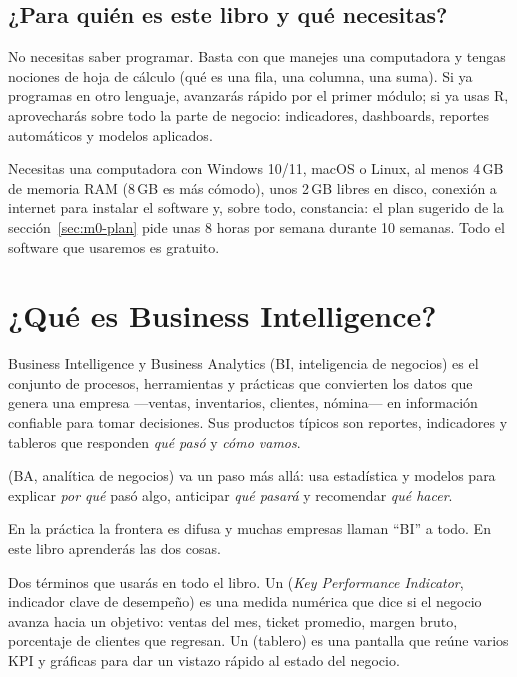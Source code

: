 \subsection{¿Para quién es este libro y qué necesitas?}

No necesitas saber programar. Basta con que manejes una computadora y tengas
nociones de hoja de cálculo (qué es una fila, una columna, una suma). Si ya
programas en otro lenguaje, avanzarás rápido por el primer módulo; si ya
usas R, aprovecharás sobre todo la parte de negocio: indicadores,
dashboards, reportes automáticos y modelos aplicados.

Necesitas una computadora con Windows 10/11, macOS o Linux, al menos 4\,GB
de memoria RAM (8\,GB es más cómodo), unos 2\,GB libres en disco, conexión a
internet para instalar el software y, sobre todo, constancia: el plan
sugerido de la sección~\ref{sec:m0-plan} pide unas 8 horas por semana
durante 10 semanas. Todo el software que usaremos es gratuito.

\section{¿Qué es Business Intelligence?}
\label{sec:m0-que-es-bi}

\begin{concepto}{Business Intelligence y Business Analytics}
 (BI, inteligencia de negocios) es el
conjunto de procesos, herramientas y prácticas que convierten los datos que
genera una empresa ---ventas, inventarios, clientes, nómina--- en
información confiable para tomar decisiones. Sus productos típicos son
reportes, indicadores y tableros que responden \emph{qué pasó} y \emph{cómo
vamos}.

 (BA, analítica de negocios) va un paso más
allá: usa estadística y modelos para explicar \emph{por qué} pasó algo,
anticipar \emph{qué pasará} y recomendar \emph{qué hacer}.

En la práctica la frontera es difusa y muchas empresas llaman ``BI'' a
todo. En este libro aprenderás las dos cosas.
\end{concepto}

Dos términos que usarás en todo el libro. Un  (\textit{Key
Performance Indicator}, indicador clave de desempeño) es una medida numérica
que dice si el negocio avanza hacia un objetivo: ventas del mes, ticket
promedio, margen bruto, porcentaje de clientes que regresan. Un
 (tablero) es una pantalla que reúne varios KPI y
gráficas para dar un vistazo rápido al estado del negocio.

